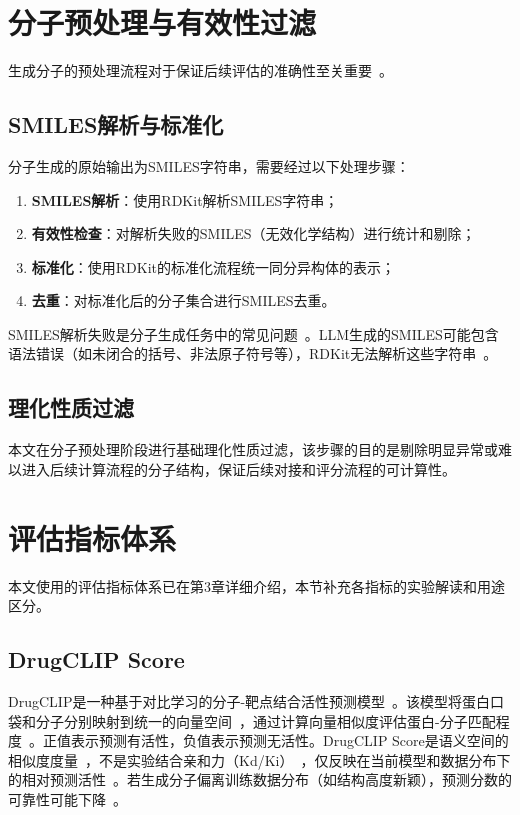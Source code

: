 \section{分子预处理与有效性过滤}\label{sec:molecule-prep}

生成分子的预处理流程对于保证后续评估的准确性至关重要~\cite{Trott2010}。

\subsection{SMILES解析与标准化}\label{sec:smiles-parse}

分子生成的原始输出为SMILES字符串，需要经过以下处理步骤：

\begin{enumerate}
    \item \textbf{SMILES解析}：使用RDKit解析SMILES字符串；
    \item \textbf{有效性检查}：对解析失败的SMILES（无效化学结构）进行统计和剔除；
    \item \textbf{标准化}：使用RDKit的标准化流程统一同分异构体的表示；
    \item \textbf{去重}：对标准化后的分子集合进行SMILES去重。
\end{enumerate}

SMILES解析失败是分子生成任务中的常见问题~\cite{Bagal2021}。LLM生成的SMILES可能包含语法错误（如未闭合的括号、非法原子符号等），RDKit无法解析这些字符串~\cite{RDKit}。

\subsection{理化性质过滤}\label{sec:physchem-filter}

本文在分子预处理阶段进行基础理化性质过滤，该步骤的目的是剔除明显异常或难以进入后续计算流程的分子结构，保证后续对接和评分流程的可计算性。\section{评估指标体系}\label{sec:eval-metrics}

本文使用的评估指标体系已在第3章详细介绍，本节补充各指标的实验解读和用途区分。

\subsection{DrugCLIP Score}\label{sec:drugclip-metric}

DrugCLIP是一种基于对比学习的分子-靶点结合活性预测模型~\cite{Gao2023}。该模型将蛋白口袋和分子分别映射到统一的向量空间~\cite{Gao2023}，通过计算向量相似度评估蛋白-分子匹配程度~\cite{Gao2023}。正值表示预测有活性，负值表示预测无活性。DrugCLIP Score是语义空间的相似度度量~\cite{Gao2023}，不是实验结合亲和力（Kd/Ki）~\cite{Gao2023}，仅反映在当前模型和数据分布下的相对预测活性~\cite{Gao2023}。若生成分子偏离训练数据分布（如结构高度新颖），预测分数的可靠性可能下降~\cite{Gao2023}。

